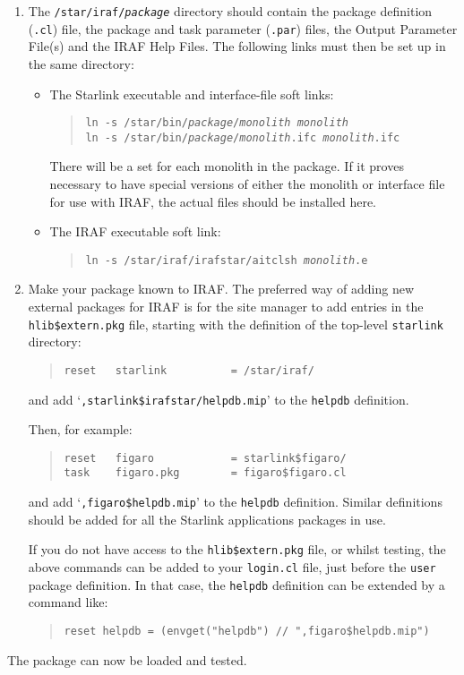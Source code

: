 \documentclass[twoside,11pt]{article}
\begin{document}
\begin{enumerate}
\item The \texttt{/star/iraf/\textit{package}} directory should contain the 
package definition (\texttt{.cl}) file, the package and task parameter 
(\texttt{.par}) files, the Output Parameter File(s) and the IRAF Help Files. 
The following links must then be set up in the same directory:
\begin{itemize}
\item The Starlink executable and interface-file soft links:
\begin{quote}
\texttt{ln -s /star/bin/\textit{package}/\textit{monolith} \textit{monolith}\\
ln -s /star/bin/\textit{package}/\textit{monolith}.ifc \textit{monolith}.ifc}
\end{quote}
There will be a set for each monolith in the package. If it proves necessary
to have special versions of either the monolith or interface file for use with
IRAF, the actual files should be installed here.
\item The IRAF executable soft link:
\begin{quote}
\texttt{ln -s /star/iraf/irafstar/aitclsh \emph{monolith}.e}
\end{quote}
\end{itemize}

\item Make your package known to IRAF.
The preferred way of adding new external packages for IRAF is for the site
manager to add entries in the \texttt{hlib\$extern.pkg} file, starting with the 
definition of the top-level \texttt{starlink} directory:
\begin{quote} \begin{verbatim}
reset   starlink          = /star/iraf/
\end{verbatim} \end{quote}
and add `\texttt{,starlink\$irafstar/helpdb.mip}' to the \texttt{helpdb} 
definition.

Then, for example:
\begin{quote} \begin{verbatim}
reset   figaro            = starlink$figaro/
task    figaro.pkg        = figaro$figaro.cl
\end{verbatim} \end{quote}
and add `\texttt{,figaro\$helpdb.mip}' to the \texttt{helpdb} definition.
Similar definitions should be added for all the Starlink applications packages
in use. 

If you do not have access to the \texttt{hlib\$extern.pkg} file, or whilst 
testing, the above commands can be added to your \texttt{login.cl} file, just 
before the \texttt{user} package definition. 
In that case, the \texttt{helpdb} definition can be extended by a command like:
\begin{quote} \begin{verbatim}
reset helpdb = (envget("helpdb") // ",figaro$helpdb.mip")
\end{verbatim} \end{quote}
\end{enumerate}
The package can now be loaded and tested.
\end{document}

